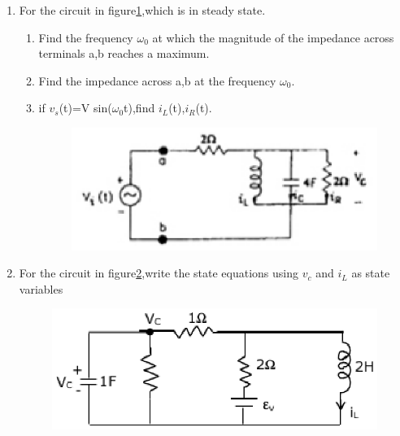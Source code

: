 \documentclass[journal,12pt,twocolumn]{IEEEtran}
\begin{document}
\begin{enumerate}
\item For the circuit in figure\ref{fig34},which is in steady state.
\begin{enumerate}
\setlength\itemsep{2em}
\item Find the frequency $\omega_{0}$ at which the magnitude of the impedance across
terminals a,b reaches a maximum.
\item Find the impedance across a,b at the frequency $\omega_{0}$.
\item if $v_{s}$(t)=V sin($\omega_{0}$t),find $i_{L}$(t),$i_{R}$(t).
\begin{figure}[!h]
\begin{center}
\includegraphics[scale=0.9]{./figs/fig34.eps}
\caption{}
\label{fig34}
\end{center}
\end{figure}
\end{enumerate}

\item For the circuit in figure\ref{fig35},write the state equations using $v_{c}$ and $i_{L}$ as state variables
\begin{figure}[!h]
\begin{center}
\includegraphics[scale=0.5]{./figs/fig35.eps}
\caption{}
\label{fig35}
\end{center}
\end{figure}



\end{enumerate}
\end{document}
